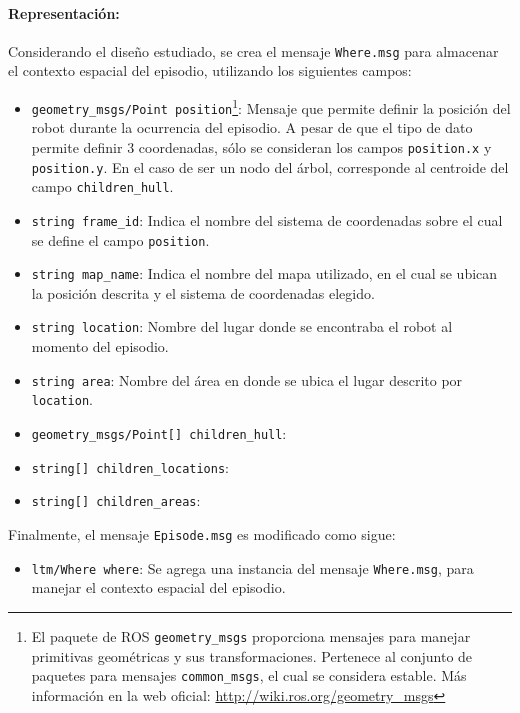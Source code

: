 \paragraph{Representación:}
Considerando el diseño estudiado, se crea el mensaje \texttt{Where.msg} para almacenar el contexto espacial del episodio, utilizando los siguientes campos:
\begin{itemize}
	\item \texttt{geometry\_msgs/Point position}\footnote{El paquete de ROS \texttt{geometry\_msgs} proporciona mensajes para manejar primitivas geométricas y sus transformaciones. Pertenece al conjunto de paquetes para mensajes \texttt{common\_msgs}, el cual se considera estable. Más información en la web oficial: \url{http://wiki.ros.org/geometry\_msgs}}: Mensaje que permite definir la posición del robot durante la ocurrencia del episodio. A pesar de que el tipo de dato permite definir 3 coordenadas, sólo se consideran los campos \texttt{position.x} y \texttt{position.y}. En el caso de ser un nodo del árbol, corresponde al centroide del campo \texttt{children\_hull}.
	\item \texttt{string frame\_id}: Indica el nombre del sistema de coordenadas sobre el cual se define el campo \texttt{position}.
	\item \texttt{string map\_name}: Indica el nombre del mapa utilizado, en el cual se ubican la posición descrita y el sistema de coordenadas elegido. 
	\item \texttt{string location}: Nombre del lugar donde se encontraba el robot al momento del episodio.
	\item \texttt{string area}: Nombre del área en donde se ubica el lugar descrito por \texttt{location}. 
	\item \texttt{geometry\_msgs/Point[] children\_hull}:
	\item \texttt{string[] children\_locations}:
	\item \texttt{string[] children\_areas}:
\end{itemize}


Finalmente, el mensaje \texttt{Episode.msg} es modificado como sigue:
\begin{itemize}
	\item \texttt{ltm/Where where}: Se agrega una instancia del mensaje \texttt{Where.msg}, para manejar el contexto espacial del episodio.
\end{itemize}

